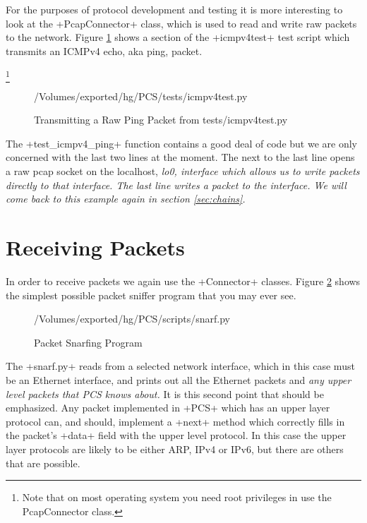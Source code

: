 \documentclass[11pt]{article}
\begin{document}
For the purposes of protocol development and testing it is more
interesting to look at the \class+PcapConnector+ class, which is used
to read and write raw packets to the network.  Figure
\ref{fig:transmitting-a-raw-ping-packet} shows a section of the
\program+icmpv4test+ test script which transmits an ICMPv4 echo, aka
ping, packet.  

\footnote{Note that on most operating system you need root privileges
  in use the PcapConnector class.}

\begin{figure}
{/Volumes/exported/hg/PCS/tests/icmpv4test.py}
  \caption{Transmitting a Raw Ping Packet from tests/icmpv4test.py}
  \label{fig:transmitting-a-raw-ping-packet}
\end{figure}

The \function+test\_icmpv4\_ping+ function contains a good deal of code
but we are only concerned with the last two lines at the moment.  The
next to the last line opens a raw pcap socket on the localhost,
\em{lo0}, interface which allows us to write packets directly to that
interface.  The last line writes a packet to the interface.  We will
come back to this example again in section \ref{sec:chains}.

\section{Receiving Packets}
\label{sec:receiving-packets}

In order to receive packets we again use the \class+Connector+
classes.  Figure \ref{fig:packet-snarfing-program} shows the simplest
possible packet sniffer program that you may ever see.

\begin{figure}
{/Volumes/exported/hg/PCS/scripts/snarf.py}
  \caption{Packet Snarfing Program}
  \label{fig:packet-snarfing-program}
\end{figure}

The \program+snarf.py+ reads from a selected network interface, which
in this case must be an Ethernet interface, and prints out all the
Ethernet packets and \emph{any upper level packets that PCS knows
  about.}  It is this second point that should be emphasized.  Any
packet implemented in \program+PCS+ which has an upper layer protocol
can, and should, implement a \method+next+ method which correctly
fills in the packet's \field+data+ field with the upper level
protocol.  In this case the upper layer protocols are likely to be
either ARP, IPv4 or IPv6, but there are others that are possible.
\end{document}
